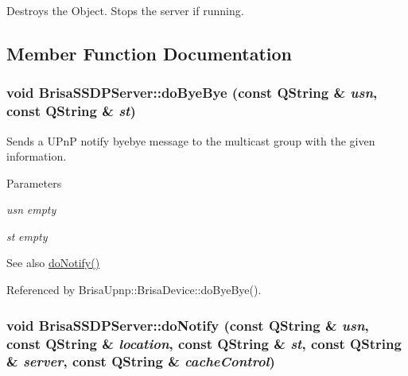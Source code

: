 Destroys the Object. Stops the server if running. 

\subsection{Member Function Documentation}
\hypertarget{classBrisaUpnp_1_1BrisaSSDPServer_afe21b672caca021dbed29b7e0e7a9744}{
\subsubsection[{doByeBye}]{\setlength{\rightskip}{0pt plus 5cm}void BrisaSSDPServer::doByeBye (const QString \& {\em usn}, \/  const QString \& {\em st})}}
\label{classBrisaUpnp_1_1BrisaSSDPServer_afe21b672caca021dbed29b7e0e7a9744}


Sends a UPnP notify byebye message to the multicast group with the given information. 
\begin{DoxyParams}{Parameters}
\item[{\em usn}]{\itshape empty\/} \item[{\em st}]{\itshape empty\/} \end{DoxyParams}
\begin{DoxySeeAlso}{See also}
\hyperlink{classBrisaUpnp_1_1BrisaSSDPServer_ac1ea6c85983ed106c4dee300e7500b74}{doNotify()} 
\end{DoxySeeAlso}


Referenced by BrisaUpnp::BrisaDevice::doByeBye().\hypertarget{classBrisaUpnp_1_1BrisaSSDPServer_ac1ea6c85983ed106c4dee300e7500b74}{
\subsubsection[{doNotify}]{\setlength{\rightskip}{0pt plus 5cm}void BrisaSSDPServer::doNotify (const QString \& {\em usn}, \/  const QString \& {\em location}, \/  const QString \& {\em st}, \/  const QString \& {\em server}, \/  const QString \& {\em cacheControl})}}
\label{classBrisaUpnp_1_1BrisaSSDPServer_ac1ea6c85983ed106c4dee300e7500b74}



